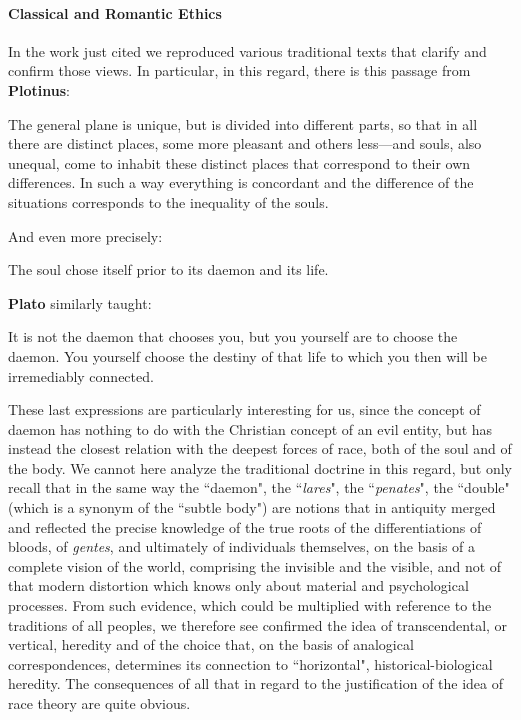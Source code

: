\hfill

\paragraph{Classical and Romantic Ethics}
In the work just cited we reproduced various traditional texts that clarify and confirm those views. In particular, in this regard, there is this passage from \textbf{Plotinus}:

\begin{quotex}
The general plane is unique, but is divided into different parts, so that in all there are distinct places, some more pleasant and others less—and souls, also unequal, come to inhabit these distinct places that correspond to their own differences. In such a way everything is concordant and the difference of the situations corresponds to the inequality of the souls. 

\end{quotex}
And even more precisely:

\begin{quotex}
The soul chose itself prior to its daemon and its life. 

\end{quotex}
\textbf{Plato} similarly taught:

\begin{quotex}
It is not the daemon that chooses you, but you yourself are to choose the daemon. You yourself choose the destiny of that life to which you then will be irremediably connected. 

\end{quotex}
These last expressions are particularly interesting for us, since the concept of daemon has nothing to do with the Christian concept of an evil entity, but has instead the closest relation with the deepest forces of race, both of the soul and of the body. We cannot here analyze the traditional doctrine in this regard, but only recall that in the same way the ``daemon", the ``\emph{lares}", the ``\emph{penates}", the ``double" (which is a synonym of the ``subtle body") are notions that in antiquity merged and reflected the precise knowledge of the true roots of the differentiations of bloods, of \emph{gentes}, and ultimately of individuals themselves, on the basis of a complete vision of the world, comprising the invisible and the visible, and not of that modern distortion which knows only about material and psychological processes. From such evidence, which could be multiplied with reference to the traditions of all peoples, we therefore see confirmed the idea of transcendental, or vertical, heredity and of the choice that, on the basis of analogical correspondences, determines its connection to ``horizontal", historical-biological heredity. The consequences of all that in regard to the justification of the idea of race theory are quite obvious.

